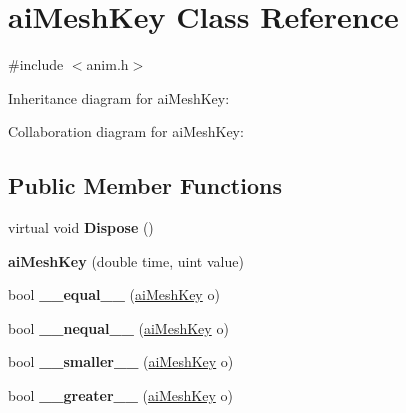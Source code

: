 \hypertarget{structai_mesh_key}{\section{ai\+Mesh\+Key Class Reference}
\label{structai_mesh_key}
}


{\ttfamily \#include $<$anim.\+h$>$}



Inheritance diagram for ai\+Mesh\+Key\+:


Collaboration diagram for ai\+Mesh\+Key\+:
\subsection*{Public Member Functions}
\begin{DoxyCompactItemize}
\item 
\hypertarget{structai_mesh_key_aebc82e3731ef4ff5a8998a7419e844b6}{virtual void {\bfseries Dispose} ()}\label{structai_mesh_key_aebc82e3731ef4ff5a8998a7419e844b6}

\item 
\hypertarget{structai_mesh_key_a284840832d05dce6fe5ebe475fcca92b}{{\bfseries ai\+Mesh\+Key} (double time, uint value)}\label{structai_mesh_key_a284840832d05dce6fe5ebe475fcca92b}

\item 
\hypertarget{structai_mesh_key_a6e53770a5f8790edc5e7b900d3dd8364}{bool {\bfseries \+\_\+\+\_\+equal\+\_\+\+\_\+} (\hyperlink{structai_mesh_key}{ai\+Mesh\+Key} o)}\label{structai_mesh_key_a6e53770a5f8790edc5e7b900d3dd8364}

\item 
\hypertarget{structai_mesh_key_a7e13e00dadbea39de5a6a1e87132ebdf}{bool {\bfseries \+\_\+\+\_\+nequal\+\_\+\+\_\+} (\hyperlink{structai_mesh_key}{ai\+Mesh\+Key} o)}\label{structai_mesh_key_a7e13e00dadbea39de5a6a1e87132ebdf}

\item 
\hypertarget{structai_mesh_key_acf9e21c3c87495ec7b2f71c28d9755b8}{bool {\bfseries \+\_\+\+\_\+smaller\+\_\+\+\_\+} (\hyperlink{structai_mesh_key}{ai\+Mesh\+Key} o)}\label{structai_mesh_key_acf9e21c3c87495ec7b2f71c28d9755b8}

\item 
\hypertarget{structai_mesh_key_a919697ab7f1e5c3e303449849b8c9039}{bool {\bfseries \+\_\+\+\_\+greater\+\_\+\+\_\+} (\hyperlink{structai_mesh_key}{ai\+Mesh\+Key} o)}\label{structai_mesh_key_a919697ab7f1e5c3e303449849b8c9039}

\end{DoxyCompactItemize}
